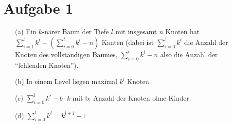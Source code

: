 \documentclass{article}
\begin{document}
\section{Aufgabe 1}
\begin{enumerate}
\item[(a)]
Ein $k$-närer Baum der Tiefe $l$ mit insgesamt $n$ Knoten hat 
$\sum_{i=1}^l k^i - (\sum_{i=0}^l k^i - n)$ Kanten 
(dabei ist $\sum_{i=0}^l k^i$ die Anzahl der Knoten des 
vollständigen Baumes, $\sum_{i=0}^l k^i - n$ also die Anzahl der 
"`fehlenden Knoten"').
\item[(b)]
In einem Level liegen maximal $k^l$ Knoten.
\item[(c)]
$\sum_{i=0}^l k^i - b \cdot k$ \qquad mit b: Anzahl der Knoten 
ohne Kinder. \\
\item[(d)]
$\sum_{i=0}^l k^i = k^{l+1} - 1$
\end{enumerate}
\end{document}
